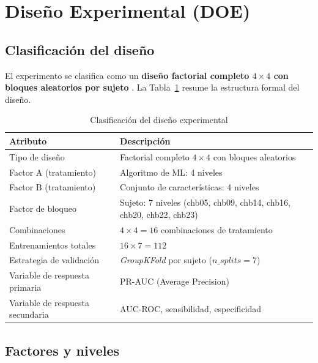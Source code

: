 \documentclass[12pt,a4paper]{article}
\begin{document}
\section{Diseño Experimental (DOE)}

\subsection{Clasificación del diseño}

El experimento se clasifica como un \textbf{diseño factorial completo $4 \times 4$ con
bloques aleatorios por sujeto} \cite{montgomery2017}. La Tabla~\ref{tab:doe_clasif}
resume la estructura formal del diseño.

\begin{table}[H]
\centering
\caption{Clasificación del diseño experimental}
\label{tab:doe_clasif}
\renewcommand{\arraystretch}{1.25}
\begin{tabularx}{\textwidth}{>{\RaggedRight\arraybackslash}p{3.5cm}
                              >{\RaggedRight\arraybackslash}X}
\toprule
\textbf{Atributo} & \textbf{Descripción} \\
\midrule
Tipo de diseño     & Factorial completo $4 \times 4$ con bloques aleatorios \\
Factor A (tratamiento) & Algoritmo de ML: 4 niveles \\
Factor B (tratamiento) & Conjunto de características: 4 niveles \\
Factor de bloqueo  & Sujeto: 7 niveles (chb05, chb09, chb14, chb16, chb20, chb22, chb23) \\
Combinaciones      & $4 \times 4 = 16$ combinaciones de tratamiento \\
Entrenamientos totales & $16 \times 7 = 112$ \\
Estrategia de validación & \textit{GroupKFold} por sujeto ($n\_splits=7$) \\
Variable de respuesta primaria & PR-AUC (Average Precision) \\
Variable de respuesta secundaria & AUC-ROC, sensibilidad, especificidad \\
\bottomrule
\end{tabularx}
\end{table}

\subsection{Factores y niveles}
\end{document}

